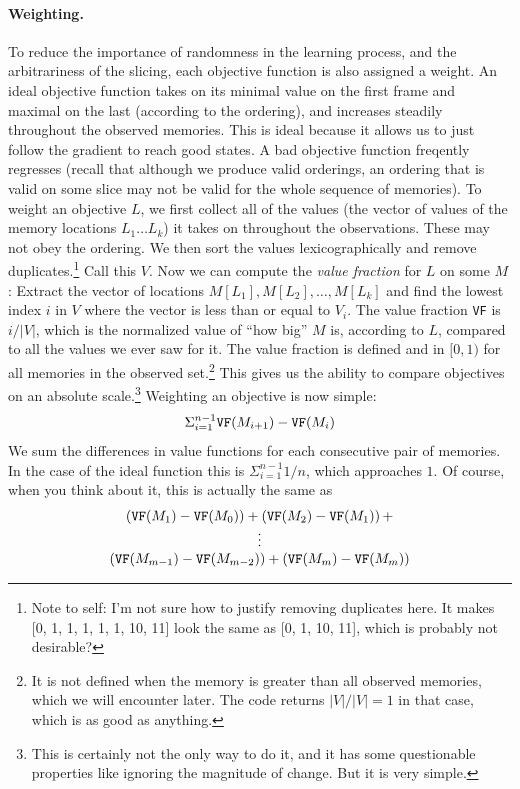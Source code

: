 \documentclass[twocolumn]{article}
\begin{document}
\paragraph{Weighting.} To reduce the importance of randomness in the
learning process, and the arbitrariness of the slicing, each objective
function is also assigned a weight. An ideal objective function takes
on its minimal value on the first frame and maximal on the last
(according to the ordering), and increases steadily throughout the
observed memories. This is ideal because it allows us to just follow
the gradient to reach good states. A bad objective function freqently
regresses (recall that although we produce valid orderings, an
ordering that is valid on some slice may not be valid for the whole
sequence of memories). To weight an objective $L$, we first collect
all of the values (the vector of values of the memory locations $L_1
\ldots L_k$) it takes on throughout the observations. These may not
obey the ordering. We then sort the values lexicographically and
remove duplicates.\footnote{Note to self: I'm not sure how to justify
  removing duplicates here. It makes [0, 1, 1, 1, 1, 1, 10, 11] look
  the same as [0, 1, 10, 11], which is probably not desirable?} Call
this $V$. Now we can compute the {\em value fraction} for $L$ on some
$M$: Extract the vector of locations $M[L_1], M[L_2], \ldots, M[L_k]$
and find the lowest index $i$ in $V$ where the vector is less than or
equal to $V_i$. The value fraction {\tt VF} is $i/|V|$, which is the
normalized value of ``how big'' $M$ is, according to $L$, compared to
all the values we ever saw for it. The value fraction is defined and
in $[0, 1)$ for all memories in the observed set.\footnote{It is not
  defined when the memory is greater than all observed memories, which
  we will encounter later. The code returns $|V|/|V| = 1$ in that case,
  which is as good as anything.} This gives us the ability to compare
objectives on an absolute scale.\footnote{This is certainly not the
  only way to do it, and it has some questionable properties like
  ignoring the magnitude of change. But it is very simple.} Weighting
an objective is now simple:
%
$$ \Sigma_{i=1}^{n-1}  {\tt VF}(M_{i+1}) - {\tt VF}(M_{i}) $$
%
We sum the differences in value functions for each consecutive pair of
memories. In the case of the ideal function this is $\Sigma_{i=1}^{n-1}
1/n$, which approaches $1$. Of course, when you think about it,
this is actually the same as
%
\[
\begin{array}{c}
({\tt VF}(M_1) - {\tt VF}(M_0)) + ({\tt VF}(M_2) - {\tt VF}(M_1)) \,+ \\
\vdots \\
({\tt VF}(M_{m-1}) - {\tt VF}(M_{m-2})) + ({\tt VF}(M_{m}) - {\tt VF}(M_{m}))
\end{array}
\]
\end{document}
